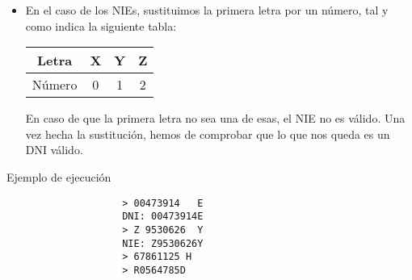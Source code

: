 \documentclass[12pt]{article}
\begin{document}
\begin{description}
\begin{itemize}
\begin{table}[H]
\begin{tabular}{|c|c|c|c|c|c|c|c|c|c|c|c|c|}
                        \hline
                    \end{tabular}
                    \end{table}
                \item En el caso de los NIEs, sustituimos la primera letra por un número, tal y como indica la siguiente tabla:
                    \begin{table}[H]
                    \centering
                    \begin{tabular}{|c|c|c|c|}
                        \hline
                        Letra & X & Y & Z \\
                        \hline
                        Número & 0 & 1 & 2 \\
                        \hline
                    \end{tabular}
                    \end{table}
                    En caso de que la primera letra no sea una de esas, el NIE no es válido. Una vez hecha la sustitución, hemos de comprobar que lo que nos queda es un DNI válido.
            \end{itemize}
            \begin{ejemplo}
                Ejemplo de ejecución
                \begin{verbatim}
                    > 00473914   E
                    DNI: 00473914E
                    > Z 9530626  Y
                    NIE: Z9530626Y
                    > 67861125 H
                    > R0564785D
                \end{verbatim}
            \end{ejemplo}
    \end{description}
\end{document}
